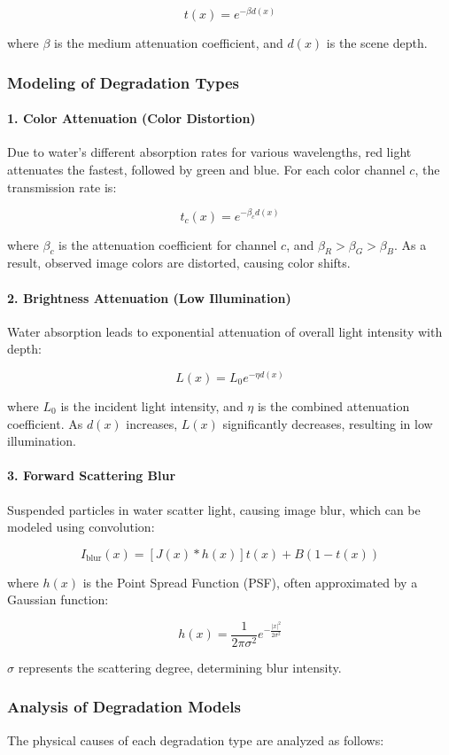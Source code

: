 \documentclass{apmcmthesis}
\begin{document}
\[
t(x) = e^{-\beta d(x)}
\]

where $\beta$ is the medium attenuation coefficient, and $d(x)$ is the scene depth.

\subsubsection{Modeling of Degradation Types}
\paragraph{1. Color Attenuation (Color Distortion)}  
Due to water's different absorption rates for various wavelengths, red light attenuates the fastest, followed by green and blue. For each color channel $c$, the transmission rate is:

\[
t_c(x) = e^{-\beta_c d(x)}
\]

where $\beta_c$ is the attenuation coefficient for channel $c$, and $\beta_R > \beta_G > \beta_B$. As a result, observed image colors are distorted, causing color shifts.

\paragraph{2. Brightness Attenuation (Low Illumination)}  
Water absorption leads to exponential attenuation of overall light intensity with depth:

\[
L(x) = L_0 e^{-\eta d(x)}
\]

where $L_0$ is the incident light intensity, and $\eta$ is the combined attenuation coefficient. As $d(x)$ increases, $L(x)$ significantly decreases, resulting in low illumination.

\paragraph{3. Forward Scattering Blur}  
Suspended particles in water scatter light, causing image blur, which can be modeled using convolution:

\[
I_{\text{blur}}(x) = \left[ J(x) * h(x) \right] t(x) + B \left( 1 - t(x) \right)
\]

where $h(x)$ is the Point Spread Function (PSF), often approximated by a Gaussian function:

\[
h(x) = \frac{1}{2\pi \sigma^2} e^{-\frac{|x|^2}{2\sigma^2}}
\]

$\sigma$ represents the scattering degree, determining blur intensity.

\subsubsection{Analysis of Degradation Models}
The physical causes of each degradation type are analyzed as follows:
\end{document}
